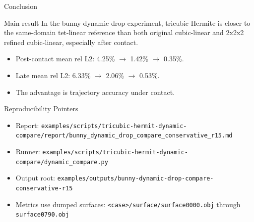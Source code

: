 \documentclass[aspectratio=169,10pt]{beamer}
\newcommand{\pct}[1]{#1\%}
\newcommand{\good}[1]{\textcolor{pgoGreen}{#1}}
\begin{document}
\begin{frame}{Conclusion}
  \small
  \begin{block}{Main result}
    In the bunny dynamic drop experiment, tricubic Hermite is closer to the
    same-domain tet-linear reference than both original cubic-linear and
    2x2x2 refined cubic-linear, especially after contact.
  \end{block}

  \vspace{0.7em}
  \begin{itemize}
    \item Post-contact mean rel L2: \pct{4.25} $\rightarrow$ \pct{1.42} $\rightarrow$ \good{\pct{0.35}}.
    \item Late mean rel L2: \pct{6.33} $\rightarrow$ \pct{2.06} $\rightarrow$ \good{\pct{0.53}}.
    \item The advantage is trajectory accuracy under contact.
  \end{itemize}
\end{frame}

\begin{frame}{Reproducibility Pointers}
  \scriptsize
  \begin{itemize}
    \item Report: \texttt{examples/scripts/tricubic-hermit-dynamic-compare/report/bunny\_dynamic\_drop\_compare\_conservative\_r15.md}
    \item Runner: \texttt{examples/scripts/tricubic-hermit-dynamic-compare/dynamic\_compare.py}
    \item Output root: \texttt{examples/outputs/bunny-dynamic-drop-compare-conservative-r15}
    \item Metrics use dumped surfaces: \texttt{<case>/surface/surface0000.obj} through \texttt{surface0790.obj}
  \end{itemize}
\end{frame}
\end{document}

